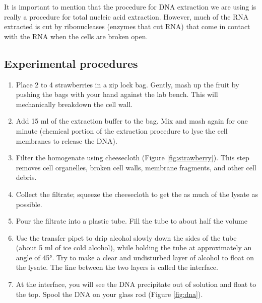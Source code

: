 \documentclass[]{book}
\providecommand{\tightlist}{%
  \setlength{\itemsep}{0pt}\setlength{\parskip}{0pt}}
\theoremstyle{definition}
\theoremstyle{definition}
\theoremstyle{definition}
\theoremstyle{remark}
\begin{document}
It is important to mention that the procedure for DNA extraction we are
using is really a procedure for total nucleic acid extraction. However,
much of the RNA extracted is cut by ribonucleases (enzymes that cut RNA)
that come in contact with the RNA when the cells are broken open.

\subsection{Experimental procedures}\label{experimental-procedures-6}

\begin{enumerate}
\def\labelenumi{\arabic{enumi}.}
\tightlist
\item
  Place 2 to 4 strawberries in a zip lock bag. Gently, mash up the fruit
  by pushing the bags with your hand against the lab bench. This will
  mechanically breakdown the cell wall.
\item
  Add 15 ml of the extraction buffer to the bag. Mix and mash again for
  one minute (chemical portion of the extraction procedure to lyse the
  cell membranes to release the DNA).
\item
  Filter the homogenate using cheesecloth (Figure \ref{fig:strawberry}).
  This step removes cell organelles, broken cell walls, membrane
  fragments, and other cell debris.
\item
  Collect the filtrate; squeeze the cheesecloth to get the as much of
  the lysate as possible.
\item
  Pour the filtrate into a plastic tube. Fill the tube to about half the
  volume
\item
  Use the transfer pipet to drip alcohol slowly down the sides of the
  tube (about 5 ml of ice cold alcohol), while holding the tube at
  approximately an angle of 45°. Try to make a clear and undisturbed
  layer of alcohol to float on the lysate. The line between the two
  layers is called the interface.
\item
  At the interface, you will see the DNA precipitate out of solution and
  float to the top. Spool the DNA on your glass rod (Figure
  \ref{fig:dna}).
\end{enumerate}
\end{document}
